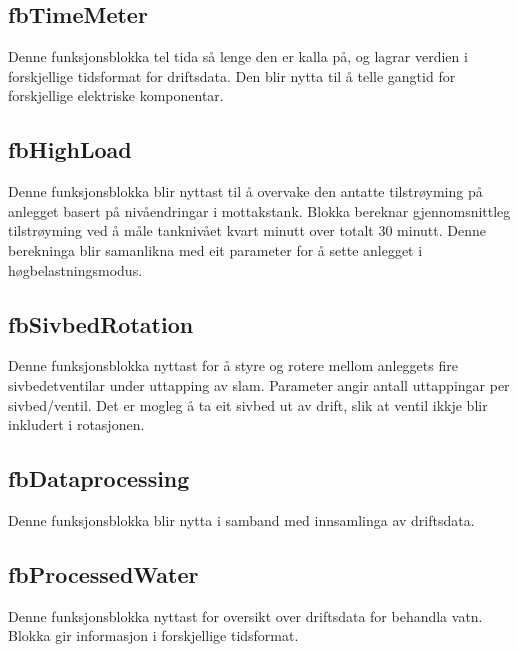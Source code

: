 \subsection{fbTimeMeter}
Denne funksjonsblokka tel tida så lenge den er kalla på, og lagrar verdien i forskjellige tidsformat for driftsdata.
Den blir nytta til å telle gangtid for forskjellige elektriske komponentar.

\newpage

\subsection{fbHighLoad}
Denne funksjonsblokka blir nyttast til å overvake den antatte tilstrøyming på anlegget basert på nivåendringar i mottakstank.
Blokka bereknar gjennomsnittleg tilstrøyming ved å måle tanknivået kvart minutt over totalt 30 minutt.
Denne berekninga blir samanlikna med eit parameter for å sette anlegget i høgbelastningsmodus.

\subsection{fbSivbedRotation}\label{sec:2}
Denne funksjonsblokka nyttast for å styre og rotere mellom anleggets fire sivbedetventilar under uttapping av slam. 
Parameter angir antall uttappingar per sivbed/ventil.
Det er mogleg å ta eit sivbed ut av drift, slik at ventil ikkje blir inkludert i rotasjonen.

\subsection{fbDataprocessing}
Denne funksjonsblokka blir nytta i samband med innsamlinga av driftsdata. 

\subsection{fbProcessedWater}
Denne funksjonsblokka nyttast for oversikt over driftsdata for behandla vatn. 
Blokka gir informasjon i forskjellige tidsformat.

\newpage

